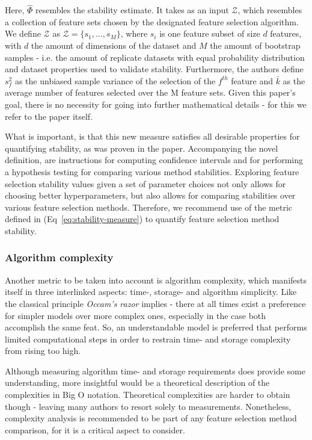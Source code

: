 \documentclass{article}
\begin{document}
Here, $\hat{\Phi}$ resembles the stability estimate. It takes as an input $\mathcal{Z}$, which resembles a collection of feature sets chosen by the designated feature selection algorithm. We define $\mathcal{Z}$ as $\mathcal{Z} = \{s_1,...,s_M\}$, where $s_i$ is one feature subset of size $d$ features, with $d$ the amount of dimensions of the dataset and $M$ the amount of bootstrap samples - i.e. the amount of replicate datasets with equal probability distribution and dataset properties used to validate stability. Furthermore, the authors define $s_{f}^{2}$ as the unbiased sample variance of the selection of the $f^{t h}$ feature and $\bar{k}$ as the average number of features selected over the M feature sets. Given this paper's goal, there is no necessity for going into further mathematical details - for this we refer to the paper itself.

What is important, is that this new measure satisfies all desirable properties for quantifying stability, as was proven in the paper. Accompanying the novel definition, are instructions for computing confidence intervals and for performing a hypothesis testing for comparing various method stabilities. Exploring feature selection stability values given a set of parameter choices not only allows for choosing better hyperparameters, but also allows for comparing stabilities over various feature selection methods. Therefore, we recommend use of the metric defined in (Eq~\ref{eq:stability-measure}) to quantify feature selection method stability.

\subsubsection{Algorithm complexity}
Another metric to be taken into account is algorithm complexity, which manifests itself in three interlinked aspects: time-, storage- and algorithm simplicity. Like the classical principle \textit{Occam's razor} implies - there at all times exist a preference for simpler models over more complex ones, especially in the case both accomplish the same feat. So, an understandable model is preferred that performs limited computational steps in order to restrain time- and storage complexity from rising too high.

Although measuring algorithm time- and storage requirements does provide some understanding, more insightful would be a theoretical description of the complexities in Big O notation. Theoretical complexities are harder to obtain though - leaving many authors to resort solely to measurements. Nonetheless, complexity analysis is recommended to be part of any feature selection method comparison, for it is a critical aspect to consider.
\end{document}
